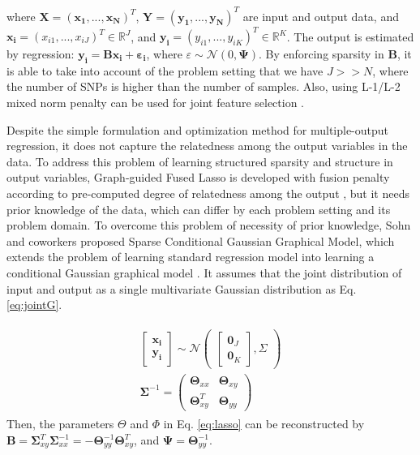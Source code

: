 \documentclass{article}
\begin{document}
where $\mathbf{X}=(\mathbf{x_1}, ... ,\mathbf{x_N})^T$, $\mathbf{Y}=(\mathbf{y_1}, ... ,\mathbf{y_N})^T$ are input and output data, and $\mathbf{x_i}=(x_{i1}, ... ,x_{iJ})^T \in \mathbb{R}^J$, and $\mathbf{y_i}=(y_{i1}, ... ,y_{iK})^T \in \mathbb{R}^K$.
The output is estimated by regression: $\mathbf{y_i}=\mathbf{Bx_i}+\mathbf{\varepsilon_i}$, where $\varepsilon  \sim \mathcal{N}(0, \mathbf{\Psi})$.
By enforcing sparsity in \textbf{B}, it is able to take into account of the problem setting that we have $J >> N$, where the number of SNPs is higher than the number of samples. Also, using L-1/L-2 mixed norm penalty can be used for joint feature selection \cite{obozinski2008high}.


Despite the simple formulation and optimization method for multiple-output regression, it does not capture the relatedness among the output variables in the data. To address this problem of learning structured sparsity and structure in output variables, Graph-guided Fused Lasso is developed with fusion penalty according to pre-computed degree of relatedness among the output \cite{kim2009statistical}, but it needs prior knowledge of the data, which can differ by each problem setting and its problem domain. To overcome this problem of necessity of prior knowledge, Sohn and coworkers proposed Sparse Conditional Gaussian Graphical Model, which extends the problem of learning standard regression model into learning a conditional Gaussian graphical model \cite{sohn2012joint}. It assumes that the joint distribution of input and output as a single multivariate Gaussian distribution as Eq. \ref{eq:jointG}.

\begin{align}\label{eq:jointG}
\begin{split}
\begin{bmatrix}
    \mathbf{x_i}\\
    \mathbf{y_i}
\end{bmatrix}
 \sim \mathcal{N}
 \begin{pmatrix}
\begin{bmatrix}
    \mathbf{0}_J  \\
   \mathbf{0}_K
\end{bmatrix}
,
    \Sigma
\end{pmatrix} \\
\mathbf{\Sigma}^{-1}= \begin{pmatrix}
    \mathbf{\Theta}_{xx} & \mathbf{\Theta}_{xy}\\
   \mathbf{\Theta}_{xy}^T &  \mathbf{\Theta}_{yy}  
\end{pmatrix}
\end{split}
\end{align}
Then, the parameters $\Theta$ and $\Phi$ in Eq. \ref{eq:lasso} can be reconstructed by $\mathbf{B}=\mathbf{\Sigma}_{xy}^T \mathbf{\Sigma}_{xx}^{-1}=-\mathbf{\Theta}_{yy}^{-1}\mathbf{\Theta}_{xy}^T$, and $\mathbf{\Psi}= \mathbf{\Theta}_{yy}^{-1}$.
\end{document}
